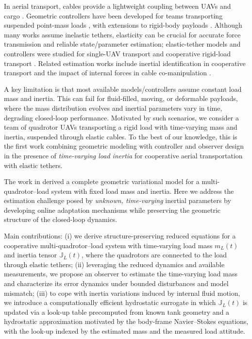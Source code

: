 \documentclass[letterpaper, 10 pt, conference]{ieeeconf}  %
\newcommand{\J}{\mathbb{J}}
\begin{document}
In aerial transport, cables provide a lightweight coupling between UAVs and cargo \cite{pacheco1,pacheco2}. Geometric controllers have been developed for teams transporting suspended point-mass loads \cite{SreLeePICDC13}, with extensions to rigid-body payloads \cite{Lee-TCST,wu}. Although many works assume inelastic tethers, elasticity can be crucial for accurate force transmission and reliable state/parameter estimation; elastic-tether models and controllers were studied for single-UAV transport \cite{Elastic,wu} and cooperative rigid-load transport \cite{jacob1,jacob2}. Related estimation works include inertial identification in cooperative transport \cite{petitti2020inertial} and the impact of internal forces in cable co-manipulation \cite{tognon2018internalforce}.

A key limitation is that most available models/controllers assume constant load mass and inertia. This can fail for fluid-filled, moving, or deformable payloads, where the mass distribution evolves and inertial parameters vary in time, degrading closed-loop performance. Motivated by such scenarios, we consider a team of quadrotor UAVs transporting a rigid load with time-varying mass and inertia, suspended through elastic cables. To the best of our knowledge, this is the first work combining geometric modeling with controller and observer design in the presence of \emph{time-varying load inertia} for cooperative aerial transportation with elastic tethers.

The work in \cite{jacob1} derived a complete geometric variational model for a multi-quadrotor--load system with fixed load mass and inertia. Here we address the estimation challenge posed by \emph{unknown, time-varying} inertial parameters by developing online adaptation mechanisms while preserving the geometric structure of the closed-loop dynamics.

Main contributions: (i) we derive structure-preserving reduced equations for a cooperative multi-quadrotor--load system with time-varying load mass $m_L(t)$ and inertia tensor $\J_L(t)$, where the quadrotors are connected to the load through elastic tethers; (ii) leveraging the reduced dynamics and available measurements, we propose an observer to estimate the time-varying load mass and characterize its error dynamics under bounded disturbances and model mismatch; (iii) to cope with inertia variations induced by internal fluid motion, we introduce a computationally efficient hydrostatic surrogate in which $\J_L(t)$ is updated via a look-up table precomputed from known tank geometry and a hydrostatic approximation motivated by the body-frame Navier--Stokes equations, with the look-up indexed by the estimated mass and the measured load attitude.
\end{document}
